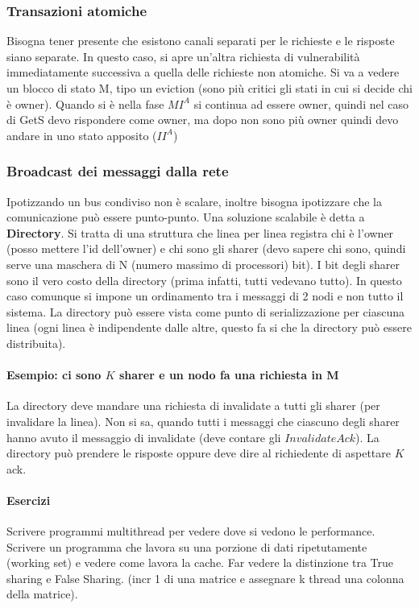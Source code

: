 \documentclass{article}
\begin{document}
\subsubsection{Transazioni atomiche}
Bisogna tener presente che esistono canali separati per le richieste e le risposte siano separate. In questo caso, si apre un'altra richiesta di vulnerabilità immediatamente successiva a quella delle richieste non atomiche.
Si va a vedere un blocco di stato M, tipo un eviction (sono più critici gli stati in cui si decide chi è owner). Quando si è nella fase $MI^A$ si continua ad essere owner, quindi nel caso di GetS devo rispondere come owner, ma dopo non sono più owner quindi devo andare in uno stato apposito ($II^A$)

\subsubsection{Broadcast dei messaggi dalla rete}
Ipotizzando un bus condiviso non è scalare, inoltre bisogna ipotizzare che la comunicazione può essere punto-punto. Una soluzione scalabile è detta a \textbf{Directory}.
Si tratta di una struttura che linea per linea registra chi è l'owner (posso mettere l'id dell'owner) e chi sono gli sharer (devo sapere chi sono, quindi serve una maschera di N (numero massimo di processori) bit). I bit degli sharer sono il vero costo della directory (prima infatti, tutti vedevano tutto). In questo caso comunque si impone un ordinamento tra i messaggi di 2 nodi e non tutto il sistema. La directory può essere vista come punto di serializzazione per ciascuna linea (ogni linea è indipendente dalle altre, questo fa si che la directory può essere distribuita).

\paragraph{Esempio: ci sono $K$ sharer e un nodo fa una richiesta in M}
La directory deve mandare una richiesta di invalidate a tutti gli sharer (per invalidare la linea). Non si sa, quando tutti i messaggi che ciascuno degli sharer hanno avuto il messaggio di invalidate (deve contare gli $InvalidateAck$). La directory può prendere le risposte oppure deve dire al richiedente di aspettare $K$ ack.

\paragraph{Esercizi}
Scrivere programmi multithread per vedere dove si vedono le performance.
Scrivere un programma che lavora su una porzione di dati ripetutamente (working set) e vedere come lavora la cache.
Far vedere la distinzione tra True sharing e False Sharing. (incr 1 di una matrice e assegnare k thread una colonna della matrice).
\end{document}
